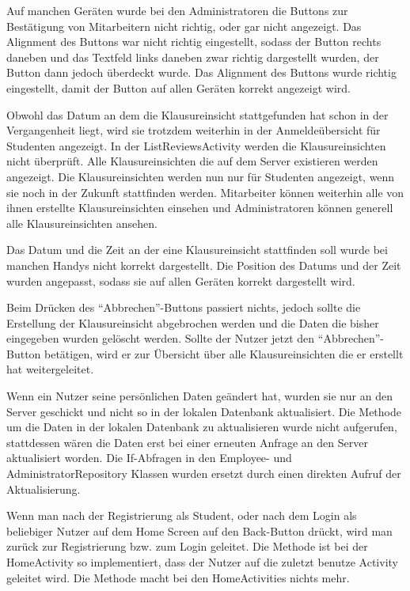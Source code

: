 		{Auf manchen Geräten wurde bei den Administratoren die Buttons zur Bestätigung von Mitarbeitern nicht richtig, oder gar nicht angezeigt.}
		{Das Alignment des Buttons war nicht richtig eingestellt, sodass der Button rechts daneben und das Textfeld links daneben zwar richtig dargestellt wurden, der Button dann jedoch überdeckt wurde.}
		{Das Alignment des Buttons wurde richtig eingestellt, damit der Button auf allen Geräten korrekt angezeigt wird.}

		{Obwohl das Datum an dem die Klausureinsicht stattgefunden hat schon in der Vergangenheit liegt, wird sie trotzdem weiterhin in der Anmeldeübersicht für Studenten angezeigt.}
		{In der ListReviewsActivity werden die Klausureinsichten nicht überprüft. Alle Klausureinsichten die auf dem Server existieren werden angezeigt.}
		{Die Klausureinsichten werden nun nur für Studenten angezeigt, wenn sie noch in der Zukunft stattfinden werden. Mitarbeiter können weiterhin alle von ihnen erstellte Klausureinsichten einsehen und Administratoren können generell alle Klausureinsichten ansehen.}

		{Das Datum und die Zeit an der eine Klausureinsicht stattfinden soll wurde bei manchen Handys nicht korrekt dargestellt.}
		{Die Position des Datums und der Zeit wurden angepasst, sodass sie auf allen Geräten korrekt dargestellt wird.}

		{Beim Drücken des \enquote{Abbrechen}-Buttons passiert nichts, jedoch sollte die Erstellung der Klausureinsicht abgebrochen werden und die Daten die bisher eingegeben wurden gelöscht werden.}
		{Sollte der Nutzer jetzt den \enquote{Abbrechen}-Button betätigen, wird er zur Übersicht über alle Klausureinsichten die er erstellt hat weitergeleitet.}

		{Wenn ein Nutzer seine persönlichen Daten geändert hat, wurden sie nur an den Server geschickt und nicht so in der lokalen Datenbank aktualisiert.}
		{Die Methode um die Daten in der lokalen Datenbank zu aktualisieren wurde nicht aufgerufen, stattdessen wären die Daten erst bei einer erneuten Anfrage an den Server aktualisiert worden.}
		{Die If-Abfragen in den Employee- und AdministratorRepository Klassen wurden ersetzt durch einen direkten Aufruf der Aktualisierung.}

		{Wenn man nach der Registrierung als Student, oder nach dem Login als beliebiger Nutzer auf dem Home Screen auf den Back-Button drückt, wird man zurück zur Registrierung bzw. zum Login geleitet.}
		{Die Methode  ist bei der HomeActivity so implementiert, dass der Nutzer auf die zuletzt benutze Activity geleitet wird.}
		{Die  Methode macht bei den HomeActivities nichts mehr.}
